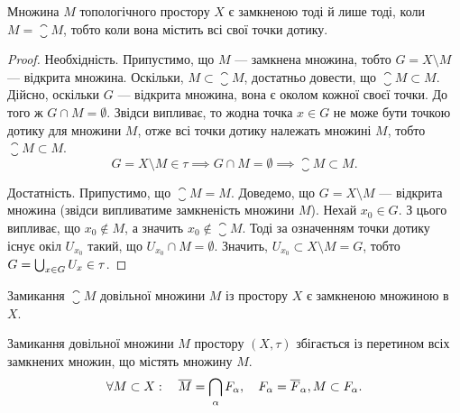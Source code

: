 \begin{theorem}
 Множина $M$
топологічного простору $X$ є замкненою тоді й лише тоді,
коли $M = \closure M$, тобто коли вона містить всі свої точки
дотику.
\end{theorem}

\begin{proof}
Необхідність. Припустимо, що $M$ --- замкнена
множина, тобто $G = X \setminus M$ --- відкрита множина. Оскільки,
$M \subset \closure M$, достатньо довести, що $\closure M \subset M$. Дійсно, оскільки
$G$ --- відкрита множина, вона є околом кожної своєї точки.
До того ж $G \cap M = \emptyset$. Звідси випливає, то жодна точка
$x \in G$ не може бути точкою дотику для множини $M$, отже
всі точки дотику належать множині $M$, тобто $\closure M \subset M$.
\begin{equation*}
G = X \setminus M \in \tau \implies
G \cap M = \emptyset \implies
\closure M \subset M.
\end{equation*}

Достатність. Припустимо, що $\closure M = M$. Доведемо, що
$G = X \setminus M$ --- відкрита множина (звідси випливатиме
замкненість множини $M$). Нехай $x_0 \in G$. З цього випливає,
що $x_0 \not\in M$, а значить $x_0 \not\in \closure M$. Тоді за означенням точки
дотику існує окіл
$U_{x_0}$ такий, що $U_{x_0} \cap M = \emptyset$. Значить,
$U_{x_0} \subset X \setminus M = G$, тобто $G = \operatorname*{\bigcup}_{x \in G} U_x \in \tau$.
\end{proof}

\begin{corollary}
Замикання $\closure M$ довільної множини $M$ із
простору $X$ є замкненою множиною в $X$.
\end{corollary}

\begin{theorem}
Замикання довільної множини $M$ простору
$(X, \tau)$ збігається із перетином всіх замкнених множин, що
містять множину $M$.
\begin{equation*}
\forall M \subset X: \quad
\overline{M} = \operatorname*{\bigcap}_\alpha F_\alpha, \quad
F_\alpha = \overline{F}_\alpha, M \subset F_\alpha.
\end{equation*}
\end{theorem}

